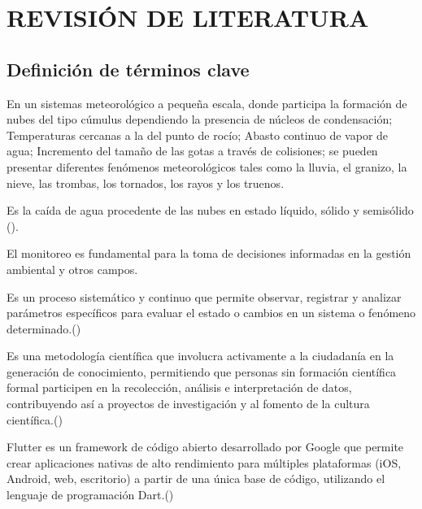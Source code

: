 \chapter{REVISIÓN DE LITERATURA}
\section{Definición de términos clave}
En un sistemas meteorológico a pequeña escala, donde participa la formación de nubes del tipo cúmulus dependiendo la presencia de núcleos de condensación; Temperaturas cercanas a la del punto de rocío; Abasto continuo de vapor de agua; Incremento del tamaño de las gotas a través de colisiones; se pueden presentar diferentes fenómenos meteorológicos tales como la lluvia, el granizo, la nieve, las trombas, los tornados, los rayos y los truenos.
\begin{definition}[Precipitación]
  Es la caída de agua procedente de las nubes en estado líquido, sólido y semisólido (\cite{breña2013}).
\end{definition}


El monitoreo es fundamental para la toma de decisiones informadas en la gestión ambiental y otros campos.
\begin{definition}[Monitoreo]
  Es un proceso sistemático y continuo que permite observar, registrar y analizar parámetros específicos para evaluar el estado o cambios en un sistema o fenómeno determinado.(\cite{ciga_monitoreo})
\end{definition}


\begin{definition}
Es una metodología científica que involucra activamente a la ciudadanía en la generación de conocimiento, permitiendo que personas sin formación científica formal participen en la recolección, análisis e interpretación de datos, contribuyendo así a proyectos de investigación y al fomento de la cultura científica.(\cite{csic_ciencia_ciudadana})
\end{definition}




\begin{definition}[Flutter]
Flutter es un framework de código abierto desarrollado por Google que permite crear aplicaciones nativas de alto rendimiento para múltiples plataformas (iOS, Android, web, escritorio) a partir de una única base de código, utilizando el lenguaje de programación Dart.(\cite{flutter_multiplataforma})
\end{definition}

